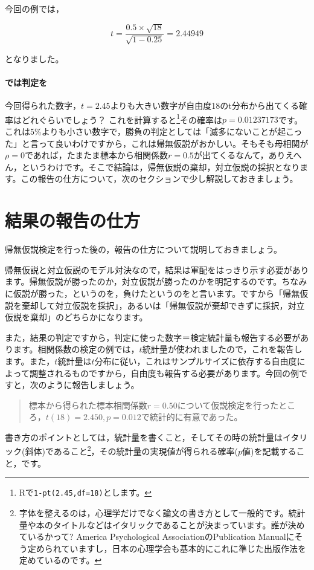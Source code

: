 \documentclass{ltjsarticle}
\begin{document}
今回の例では，

\[ t = \frac{0.5 \times \sqrt{18}}{\sqrt{1-0.25}} = 2.44949 \]

となりました。

\paragraph{では判定を}

今回得られた数字，$t=2.45$よりも大きい数字が自由度18のt分布から出てくる確率はどれぐらいでしょう？ これを計算すると\footnote{Rで\texttt{1-pt(2.45,df=18)}とします。}その確率は$p=0.01237173$です。これは5\%よりも小さい数字で，勝負の判定としては「滅多にないことが起こった」と言って良いわけですから，これは帰無仮説がおかしい。そもそも母相関が$\rho=0$であれば，たまたま標本から相関係数$r=0.5$が出てくるなんて，ありえへん，というわけです。そこで結論は，帰無仮説の棄却，対立仮説の採択となります。この報告の仕方について，次のセクションで少し解説しておきましょう。

\section{結果の報告の仕方}
帰無仮説検定を行った後の，報告の仕方について説明しておきましょう。

帰無仮説と対立仮説のモデル対決なので，結果は軍配をはっきり示す必要があります。帰無仮説が勝ったのか，対立仮説が勝ったのかを明記するのです。ちなみに仮説が勝った，というのを，負けたというのをと言います。ですから「帰無仮説を棄却して対立仮説を採択」，あるいは「帰無仮説が棄却できずに採択，対立仮説を棄却」のどちらかになります。

また，結果の判定ですから，判定に使った数字＝検定統計量も報告する必要があります。相関係数の検定の例では，$t$統計量が使われましたので，これを報告します。また，$t$統計量は$t$分布に従い，これはサンプルサイズに依存する自由度によって調整されるものですから，自由度も報告する必要があります。今回の例ですと，次のように報告しましょう。
\begin{quote}
標本から得られた標本相関係数$r=0.50$について仮説検定を行ったところ，$t(18)=2.450,p=0.012$で統計的に有意であった。
\end{quote}
書き方のポイントとしては，統計量を書くこと，そしてその時の統計量はイタリック(斜体)であること\footnote{字体を整えるのは，心理学だけでなく論文の書き方として一般的です。統計量や本のタイトルなどはイタリックであることが決まっています。誰が決めているかって? America Psychological AssociationのPublication Manualにそう定められていますし，日本の心理学会も基本的にこれに準じた出版作法を定めているのです。}，その統計量の実現値が得られる確率($p$値)を記載すること，です。
\end{document}
